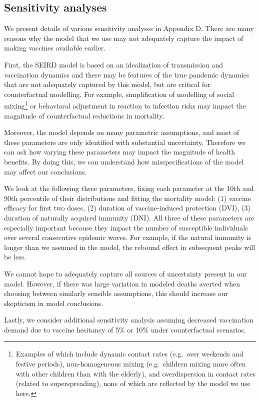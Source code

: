 \documentclass{article}
\begin{document}
\subsection{Sensitivity analyses}\label{sensitivity-analyses}

We present details of various sensitivity analyses in Appendix D. There are many reasons why the model that we use may not adequately capture the impact of making vaccines available earlier.

First, the SEIRD model is based on an idealization of transmission and vaccination dynamics and there may be features of the true pandemic dynamics that are not adequately captured by this model, but are critical for counterfactual modelling. For example, simplification of modelling of social mixing\footnote{Examples of which include dynamic contact rates (e.g.~over weekends and festive periods), non-homogeneous mixing (e.g.~children mixing more often with other children than with the elderly), and overdispersion in contact rates (related to superspreading), none of which are reflected by the model we use here.} or behavioral adjustment in reaction to infection risks may impact the magnitude of counterfactual reductions in mortality.

Moreover, the model depends on many parametric assumptions, and most of these parameters are only identified with substantial uncertainty. Therefore we can ask how varying these parameters may impact the magnitude of health benefits. By doing this, we can understand how misspecifications of the model may affect our conclusions.

We look at the following three parameters, fixing each parameter at the 10th and 90th percentile of their distributions and fitting the mortality model: (1) vaccine efficacy for first two doses, (2) duration of vaccine-induced protection (DVI), (3) duration of naturally acquired immunity (DNI). All three of these parameters are especially important because they impact the number of susceptible individuals over several consecutive epidemic waves. For example, if the natural immunity is longer than we assumed in the model, the rebound effect in subsequent peaks will be less.

We cannot hope to adequately capture all sources of uncertainty present in our model. However, if there was large variation in modeled deaths averted when choosing between similarly sensible assumptions, this should increase our skepticism in model conclusions.

Lastly, we consider additional sensitivity analysis assuming decreased vaccination demand due to vaccine hesitancy of 5\% or 10\% under counterfactual scenarios.
\end{document}
